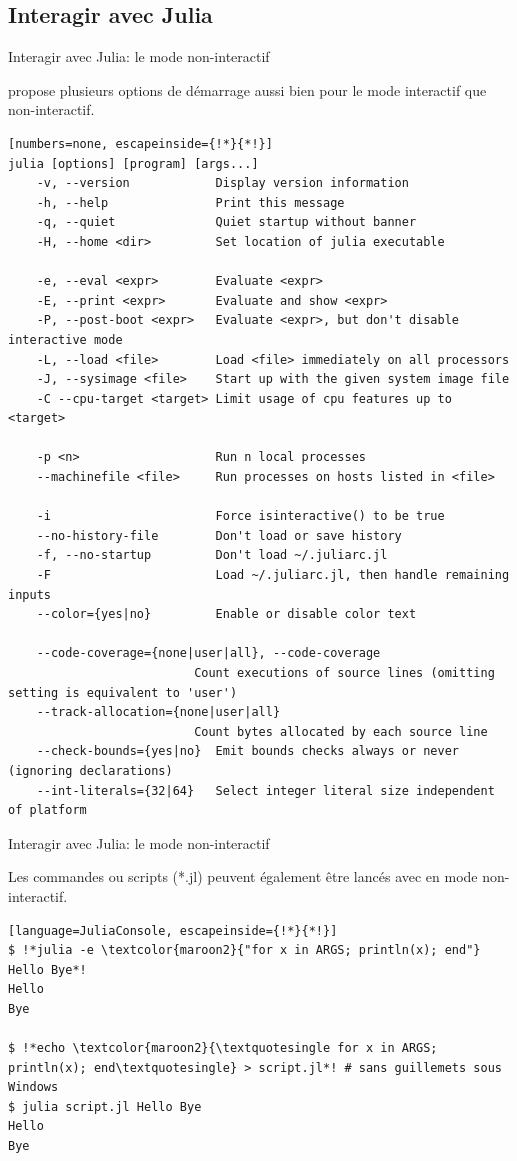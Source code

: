 \subsection{Interagir avec Julia}
\begin{frame}[containsverbatim]{Interagir avec Julia: le mode non-interactif}
\par{{\Julia} propose plusieurs options de démarrage aussi bien pour le mode interactif que non-interactif.}
\begin{lstlisting}[numbers=none, escapeinside={!*}{*!}]
julia [options] [program] [args...]
    -v, --version            Display version information
    -h, --help               Print this message
    -q, --quiet              Quiet startup without banner
    -H, --home <dir>         Set location of julia executable

    -e, --eval <expr>        Evaluate <expr>
    -E, --print <expr>       Evaluate and show <expr>
    -P, --post-boot <expr>   Evaluate <expr>, but don't disable interactive mode
    -L, --load <file>        Load <file> immediately on all processors
    -J, --sysimage <file>    Start up with the given system image file
    -C --cpu-target <target> Limit usage of cpu features up to <target>

    -p <n>                   Run n local processes
    --machinefile <file>     Run processes on hosts listed in <file>

    -i                       Force isinteractive() to be true
    --no-history-file        Don't load or save history
    -f, --no-startup         Don't load ~/.juliarc.jl
    -F                       Load ~/.juliarc.jl, then handle remaining inputs
    --color={yes|no}         Enable or disable color text

    --code-coverage={none|user|all}, --code-coverage
                          Count executions of source lines (omitting setting is equivalent to 'user')
    --track-allocation={none|user|all}
                          Count bytes allocated by each source line
    --check-bounds={yes|no}  Emit bounds checks always or never (ignoring declarations)
    --int-literals={32|64}   Select integer literal size independent of platform
\end{lstlisting}
\end{frame}


\begin{frame}[containsverbatim]{Interagir avec Julia: le mode non-interactif}
\par{Les commandes ou scripts (*.jl) peuvent également être lancés avec {\Julia} en mode non-interactif.}
\begin{lstlisting}[language=JuliaConsole, escapeinside={!*}{*!}]
$ !*julia -e \textcolor{maroon2}{"for x in ARGS; println(x); end"} Hello Bye*!
Hello
Bye

$ !*echo \textcolor{maroon2}{\textquotesingle for x in ARGS; println(x); end\textquotesingle} > script.jl*! # sans guillemets sous Windows
$ julia script.jl Hello Bye
Hello
Bye
\end{lstlisting}
\end{frame}


